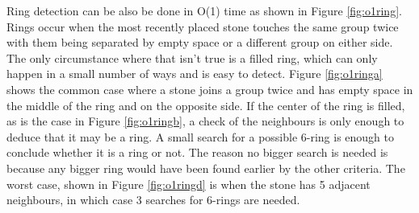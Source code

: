 Ring detection can be also be done in O(1) time as shown in Figure \ref{fig:o1ring}. Rings occur when the most recently placed stone touches the same group twice with them being separated by empty space or a different group on either side. The only circumstance where that isn't true is a filled ring, which can only happen in a small number of ways and is easy to detect. Figure \ref{fig:o1ringa} shows the common case where a stone joins a group twice and has empty space in the middle of the ring and on the opposite side. If the center of the ring is filled, as is the case in Figure \ref{fig:o1ringb}, a check of the neighbours is only enough to deduce that it may be a ring. A small search for a possible 6-ring is enough to conclude whether it is a ring or not. The reason no bigger search is needed is because any bigger ring would have been found earlier by the other criteria. The worst case, shown in Figure \ref{fig:o1ringd} is when the stone has 5 adjacent neighbours, in which case 3 searches for 6-rings are needed.

